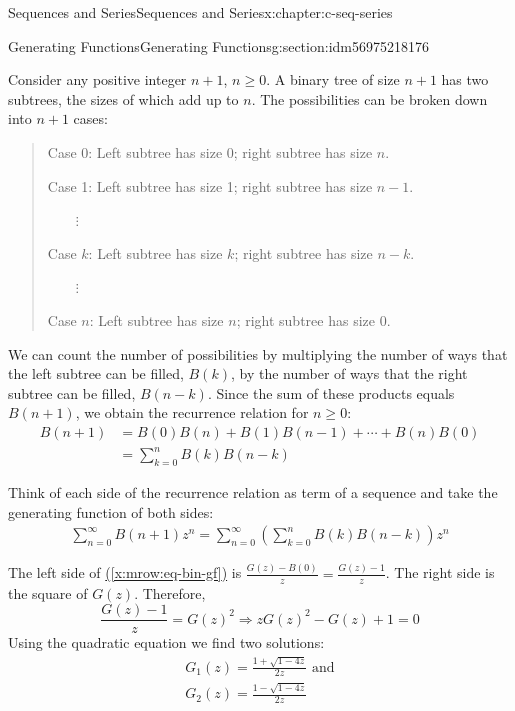 \documentclass[twoside,10pt,]{book}
\newcommand{\xreffont}{\relax}
\numberwithin{equation}{section}
\begin{document}
\begin{chapterptx}{Sequences and Series}{}{Sequences and Series}{}{}{x:chapter:c-seq-series}
\begin{sectionptx}{Generating Functions}{}{Generating Functions}{}{}{g:section:idm56975218176}
\par
Consider any positive integer \(n + 1\), \(n \geq  0\). A binary tree of size \(n + 1\) has two subtrees, the sizes of which add up to \(n\). The possibilities can be broken down into \(n + 1\) cases:%
\begin{quote}%
Case 0: Left subtree has size 0; right subtree has size \(n\).%
\par
Case 1: Left subtree has size 1; right subtree has size \(n - 1\).%
\par
\(\quad \quad \)\(\vdots\)%
\par
Case \(k\): Left subtree has size \(k\); right subtree has size \(n - k\).%
\par
\(\quad \quad \)\(\vdots\)%
\par
Case \(n\): Left subtree has size \(n\); right subtree has size 0.%
\end{quote}
We can count the number of possibilities by multiplying the number of ways that the left subtree can be filled, \(B(k)\), by the number of ways that the right subtree can be filled, \(B(n-k)\). Since the sum of these products equals \(B(n + 1)\), we obtain the recurrence relation for \(n\geq 0\):%
\begin{equation*}
\begin{split}
B(n+1) &= B(0)B(n)+ B(1)B(n-1)+ \cdots  + B(n)B(0)\\
&=\sum_{k=0}^n B(k) B(n-k)
\end{split} 
\end{equation*}
%
\par
Think of each side of the recurrence relation as term of a sequence and take the generating function of both sides:%
\begin{gather}
\sum_{n=0}^{\infty } B(n+1) z^n= \sum_{n=0}^{\infty }  \left(\sum_{k=0}^n B(k) B(n-k)\right)z^n\label{x:mrow:eq-bin-gf}
\end{gather}
%
\par
The left side of \hyperref[x:mrow:eq-bin-gf]{({\xreffont\ref{x:mrow:eq-bin-gf}})} is  \(\frac{G(z)-B(0)}{z}=\frac{G(z)-1}{z}\). The right side is the square of \(G(z)\). Therefore,%
\begin{equation*}
\frac{G(z)-1}{z}= G(z)^2  \Rightarrow  z G(z)^2- G(z) + 1 = 0
\end{equation*}
Using the quadratic equation we find two solutions:%
\begin{gather}
G_1(z) = \frac{1+\sqrt{1-4 z}}{2z} \textrm{ and}\label{g:mrow:idm56975194304}\\
G_2(z) = \frac{1-\sqrt{1-4 z}}{2z}\label{g:mrow:idm56975194016}

\end{gather}
\end{sectionptx}
\end{chapterptx}
\end{document}
